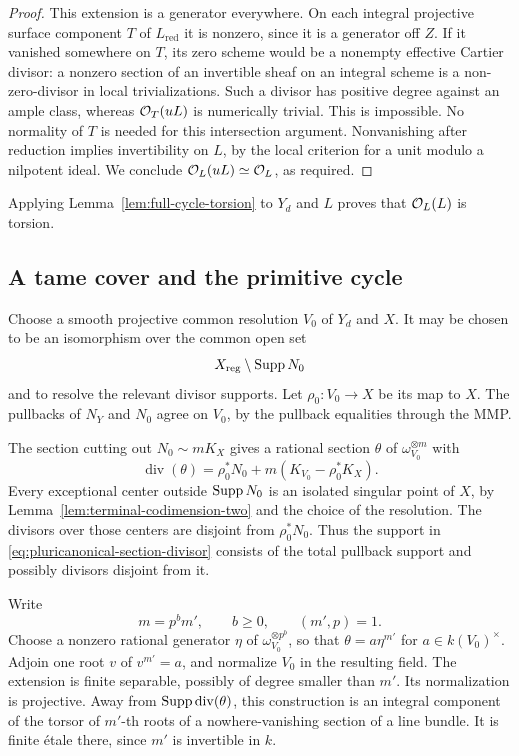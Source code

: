 \begin{proof}
This extension is a generator everywhere.
On each integral projective surface component \(T\) of \(L_{\mathrm{red}}\)
it is nonzero, since it is a generator off \(Z\).
If it vanished somewhere on \(T\), its zero scheme would be a nonempty
effective Cartier divisor: a nonzero section of an invertible sheaf
on an integral scheme is a non-zero-divisor in local trivializations.
Such a divisor has positive degree against an ample class, whereas
\(\mathcal O_T(uL)\) is numerically trivial.  This is impossible.
No normality of \(T\) is needed for this intersection argument.
Nonvanishing after reduction implies invertibility on \(L\), by the
local criterion for a unit modulo a nilpotent ideal.
We conclude \(\mathcal O_L(uL)\simeq\mathcal O_L\), as required.
\end{proof}

Applying Lemma~\ref{lem:full-cycle-torsion} to \(Y_d\) and \(L\) proves
that \(\mathcal O_L(L)\) is torsion.

\subsection{A tame cover and the primitive cycle}

Choose a smooth projective common resolution \(V_0\) of \(Y_d\) and \(X\).
It may be chosen to be an isomorphism over the common open set
\[
 X_{\mathrm{reg}}\setminus\operatorname{Supp} N_0
\]
and to resolve the relevant divisor supports.
Let \(\rho_0:V_0\to X\) be its map to \(X\).
The pullbacks of \(N_Y\) and \(N_0\) agree on \(V_0\), by the pullback
equalities through the MMP.

The section cutting out \(N_0\sim mK_X\) gives a rational section
\(\theta\) of \(\omega_{V_0}^{\otimes m}\) with
\begin{equation}
\label{eq:pluricanonical-section-divisor}
 \operatorname{div}(\theta)
     =\rho_0^*N_0+m(K_{V_0}-\rho_0^*K_X).
\end{equation}
Every exceptional center outside \(\operatorname{Supp} N_0\) is an isolated singular
point of \(X\), by Lemma~\ref{lem:terminal-codimension-two} and the choice
of the resolution.  The divisors over those centers are disjoint from
\(\rho_0^*N_0\).
Thus the support in \eqref{eq:pluricanonical-section-divisor} consists
of the total pullback support and possibly divisors disjoint from it.

Write
\[
 m=p^bm',\qquad b\geq0,\qquad (m',p)=1.
\]
Choose a nonzero rational generator \(\eta\) of
\(\omega_{V_0}^{\otimes p^b}\), so that
\(\theta=a\eta^{m'}\) for \(a\in k(V_0)^\times\).
Adjoin one root \(v\) of \(v^{m'}=a\), and normalize \(V_0\) in the
resulting field.  The extension is finite separable, possibly of degree
smaller than \(m'\).  Its normalization is projective.
Away from \(\operatorname{Supp}\operatorname{div}(\theta)\), this construction is an
integral component of the torsor of \(m'\)-th roots of a nowhere-vanishing
section of a line bundle.  It is finite étale there, since \(m'\) is
invertible in \(k\).

